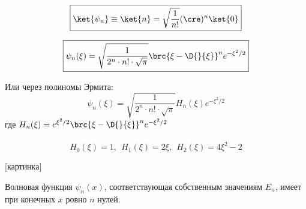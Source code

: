 $$
\boxed {
	\ket{\psi_n} \equiv \ket{n} = \sqrt{\frac{1}{n!}}(\cre)^n \ket{0}
}
$$

$$
\boxed {
	\psi_n(\xi) = \sqrt{\frac{1}{2^n \cdot n! \cdot \sqrt{\pi}}} \brc{\xi - \D{}{\xi}}^n e^{-\xi^2/2}
}
$$

Или через полиномы Эрмита:
$$
\boxed {
	\psi_n(\xi) = \sqrt{\frac{1}{2^n \cdot n! \cdot \sqrt{\pi}}} H_n(\xi) e^{-\xi^2/2}
}
$$
где $H_n(\xi) = e^{\xi^2/2} \brc{\xi - \D{}{\xi}}^n e^{-\xi^2/2} $\\
\\
$$
H_0(\xi) = 1,~~ H_1(\xi) = 2\xi,~~ H_2(\xi) = 4\xi^2 - 2
$$

[картинка]

\begin{thm}
Волновая функция $\psi_n(x)$, соответствующая собственным значениям $E_n$, имеет при конечных $x$ ровно $n$ нулей.
\end{thm}

